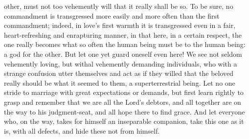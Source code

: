 \documentclass[12pt,a4paper]{book}
\begin{document}
other, must not too vehemently will that it really shall be so. To be sure,
no commandment is transgressed more easily and more often than the first
commandment; indeed, in love's first warmth it is transgressed even in a
fair, heart-refreshing and enrapturing manner, in that here, in a certain
respect, the one really becomes what so often the human being must be to
the human being: a god for the other. But let one yet guard oneself even
here! We see not seldom vehemently loving, but withal vehemently demanding
individuals, who with a strange confusion utter themselves and act as if
they willed that the beloved really should be what it seemed to them, a
superterrestrial being. Let no one stride to marriage with great
expectations or demands, but first learn rightly to grasp and remember that
we are all the Lord's debtors, and all together are on the way to his
judgment-seat, and all hope there to find grace. And let everyone who, on
the way, takes for himself an inseparable companion, take this one as it
is, with all defects, and hide these not from himself.
\end{document}
